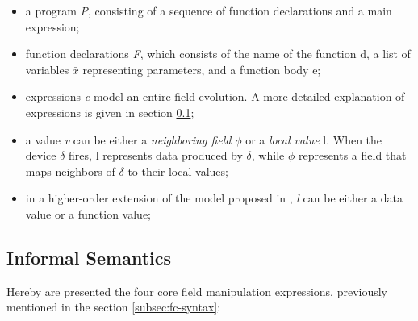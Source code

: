 \begin{itemize}
    \item a program \textit{P}, consisting of a sequence of function declarations and a main expression;
    \item function declarations \textit{F}, which consists of the name of the function d, a list of variables $\bar{x}$ representing parameters, and a function body e;
    \item expressions \textit{e} model an entire field evolution. A more detailed explanation of expressions is given in section \ref{subsec:fc-semantics};
    \item a value \textit{v} can be either a \textit{neighboring field} $\phi$ or a \textit{local value} l. When the device $\delta$ fires, l represents data produced by $\delta$, while $\phi$ represents a field that maps neighbors of $\delta$ to their local values;
    \item in a higher-order extension of the model proposed in \cite{10.1145/3285956}, \textit{l} can be either a data value or a function value;
\end{itemize}

\subsection{Informal Semantics}
\label{subsec:fc-semantics}
Hereby are presented the four core field manipulation expressions, previously mentioned in the section \ref{subsec:fc-syntax}:

